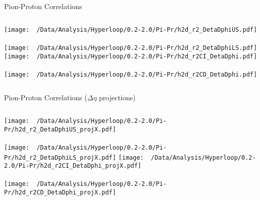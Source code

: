 \documentclass{beamer}
\begin{document}
\begin{frame}{Pion-Proton Correlations}
	\begin{columns}
		\centering
		\texttt{[image: ~/Data/Analysis/Hyperloop/0.2-2.0/Pi-Pr/h2d\_r2\_DetaDphiUS.pdf]}\\~\\
		\texttt{[image: ~/Data/Analysis/Hyperloop/0.2-2.0/Pi-Pr/h2d\_r2\_DetaDphiLS.pdf]}
		\centering
		\texttt{[image: ~/Data/Analysis/Hyperloop/0.2-2.0/Pi-Pr/h2d\_r2CI\_DetaDphi.pdf]}\\~\\
		\texttt{[image: ~/Data/Analysis/Hyperloop/0.2-2.0/Pi-Pr/h2d\_r2CD\_DetaDphi.pdf]}
	\end{columns}
\end{frame}
\begin{frame}{Pion-Proton Correlations ($\Delta\eta$ projections)}
	\begin{columns}
		\column{0.5\linewidth}
		\centering
		\texttt{[image: ~/Data/Analysis/Hyperloop/0.2-2.0/Pi-Pr/h2d\_r2\_DetaDphiUS\_projX.pdf]}\\~\\
		\texttt{[image: ~/Data/Analysis/Hyperloop/0.2-2.0/Pi-Pr/h2d\_r2\_DetaDphiLS\_projX.pdf]}
		\column{0.5\linewidth}
		\centering
		\texttt{[image: ~/Data/Analysis/Hyperloop/0.2-2.0/Pi-Pr/h2d\_r2CI\_DetaDphi\_projX.pdf]}\\~\\
		\texttt{[image: ~/Data/Analysis/Hyperloop/0.2-2.0/Pi-Pr/h2d\_r2CD\_DetaDphi\_projX.pdf]}
	\end{columns}
\end{frame}
\end{document}
